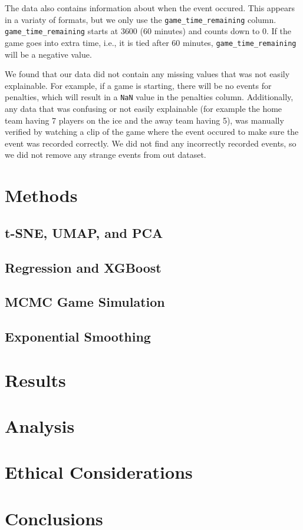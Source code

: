 \documentclass[11pt]{article}
\begin{document}
The data also contains information about when the event occured. This appears in a variaty of formats, but we only
use the {\tt game\_time\_remaining} column. {\tt game\_time\_remaining} starts
at 3600 (60 minutes) and counts down to 0. If the game goes into extra time, i.e., it is tied after 60 minutes, {\tt game\_time\_remaining} will
be a negative value.

We found that our data did not contain any missing values that was not easily explainable. For example, if a game is starting, there will be no
events for penalties, which will result in a {\tt NaN} value in the penalties column. Additionally, any data that was confusing or not easily explainable
(for example the home team having 7 players on the ice and the away team having 5), was manually verified by watching a clip of the game where
the event occured to make sure the event was recorded correctly. We did not find any incorrectly recorded events, so we 
did not remove any strange events from out dataset.

\section{Methods}
\subsection{t-SNE, UMAP, and PCA}

\subsection{Regression and XGBoost}

\subsection{MCMC Game Simulation}

\subsection{Exponential Smoothing}

\section{Results}

\section{Analysis}

\section{Ethical Considerations}

\section{Conclusions}


\end{document}
